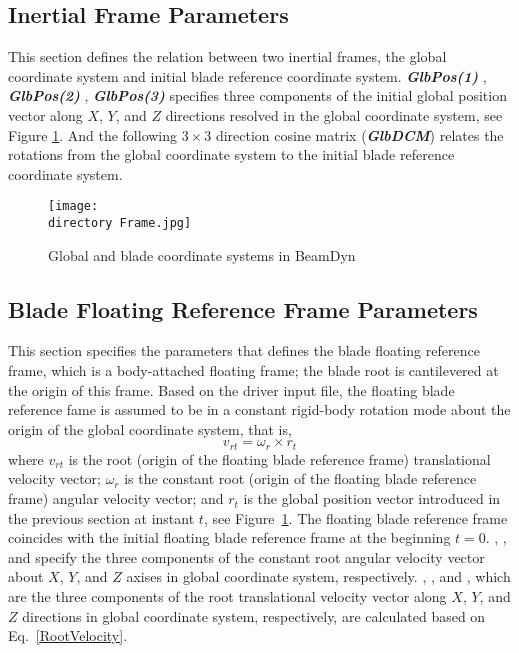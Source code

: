 \subsection{Inertial Frame Parameters}
This section defines the relation between two inertial frames, the global coordinate system and initial blade reference coordinate system. 
\textbf{\textit{GlbPos(1)} }, \textbf{\textit{GlbPos(2)} }, \textbf{\textit{GlbPos(3)} } specifies three components of the initial global position vector along $X$, $Y$, and $Z$ directions resolved in the global coordinate system, see Figure \ref{fig:Frame}. 
And the following $3 \times 3$ direction cosine matrix (\textbf{\textit{GlbDCM}}) relates the rotations from the global coordinate system to the initial blade reference coordinate system. 

\begin{figure}[h!tp]
    \centering
    \texttt{[image: \\directory Frame.jpg]}
    \caption{Global and blade coordinate systems in BeamDyn}
    \label{fig:Frame}
\end{figure}

\subsection{Blade Floating Reference Frame Parameters}

This section specifies the parameters that defines the blade floating reference frame, which is a body-attached floating frame; the blade root is cantilevered at the origin of this frame. 
Based on the driver input file, the floating blade reference fame is assumed to be in a constant rigid-body rotation mode about the origin of the global coordinate system, that is,
\begin{equation}
   \label{RootVelocity}
   v_{rt} = \omega_r \times r_t
\end{equation}
where $v_{rt}$ is the root (origin of the floating blade reference frame) translational velocity vector; $\omega_r$ is the constant root (origin of the floating blade reference frame) angular velocity vector; and $r_t$ is the global position vector introduced in the previous section at instant $t$, see Figure~\ref{fig:Frame}.  
The floating blade reference frame coincides with the initial floating blade reference frame at the beginning $t=0$. 
, , and  specify the three components of the constant root angular velocity vector about  $X$, $Y$, and $Z$ axises in global coordinate system, respectively.  
, , and , which are the three components of the root translational velocity vector along  $X$, $Y$, and $Z$ directions in global coordinate system, respectively, are calculated based on Eq.~\ref{RootVelocity}. 

